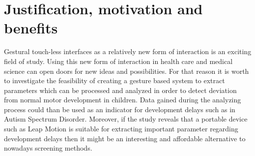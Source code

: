 



\section{Justification, motivation and benefits}
Gestural touch-less interfaces as a relatively new form of interaction is an exciting field of study. Using this new form of interaction in health care and medical science can open doors for new ideas and possibilities. For that reason it is worth to investigate the feasibility of creating a gesture based system to extract parameters which can be processed and analyzed in order to detect deviation from normal motor development in children. Data gained during the analyzing process could than be used as an indicator for development delays such as in Autism Spectrum Disorder.
Moreover, if the study reveals that a portable device such as Leap Motion is suitable for extracting important parameter regarding development delays then it might be an interesting and affordable alternative to nowadays screening methods.



